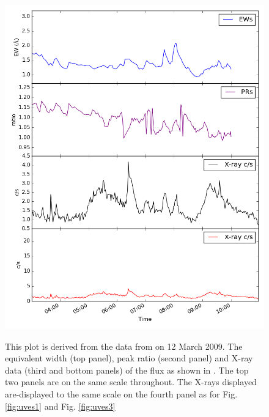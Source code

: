 \begin{figure}[!htbp]
\centering
\includegraphics[scale=0.30]{Figures/uves2.png} \\
\caption{This plot is derived from the data from {\uves} on 12 March 2009.
  The equivalent width (top panel), peak ratio (second panel) and X-ray data (third and bottom panels) of the
  {\ha} flux as shown in \citet[Fig. 1]{fuhrmeister11}. The top two panels are on the same scale
  throughout. The X-rays displayed are-displayed to the same scale on the fourth panel as for Fig. \ref{fig:uves1} and
  Fig. \ref{fig:uves3}}
 \protect\label{fig:uves2}
\end{figure}
